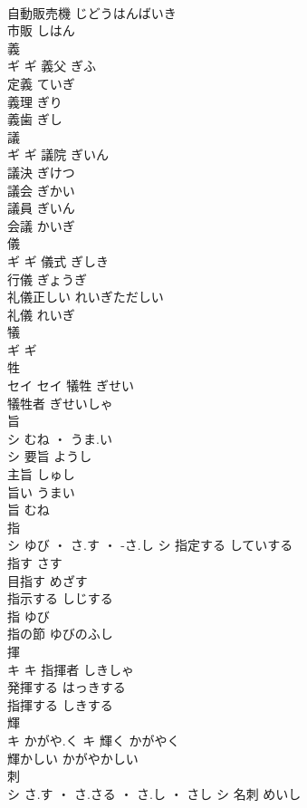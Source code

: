 \documentclass[8pt]{extreport}
\begin{document}
\begin{CJK}{UTF8}{min}
\\	自動販売機	じどうはんばいき	
\\	市販	しはん	
\\	義	
\\	ギ		ギ	義父	ぎふ	
\\	定義	ていぎ	
\\	義理	ぎり	
\\	義歯	ぎし	
\\	議	
\\	ギ		ギ	議院	ぎいん	
\\	議決	ぎけつ	
\\	議会	ぎかい	
\\	議員	ぎいん	
\\	会議	かいぎ	
\\	儀	
\\	ギ		ギ	儀式	ぎしき	
\\	行儀	ぎょうぎ	
\\	礼儀正しい	れいぎただしい	
\\	礼儀	れいぎ	
\\	犠	
\\	ギ		ギ																																			
\\	牲	
\\	セイ		セイ	犠牲	ぎせい	
\\	犠牲者	ぎせいしゃ	
\\	旨	
\\	シ	むね ・ うま.い
\\	シ	要旨	ようし	
\\	主旨	しゅし	
\\	旨い	うまい	
\\	旨	むね	
\\	指	
\\	シ	ゆび ・ さ.す ・ -さ.し	シ	指定する	していする	
\\	指す	さす	
\\	目指す	めざす	
\\	指示する	しじする	
\\	指	ゆび	
\\	指の節	ゆびのふし	
\\	揮	
\\	キ		キ	指揮者	しきしゃ	
\\	発揮する	はっきする	
\\	指揮する	しきする	
\\	輝	
\\	キ	かがや.く	キ	輝く	かがやく	
\\	輝かしい	かがやかしい	
\\	刺	
\\	シ	さ.す ・ さ.さる ・ さ.し ・ さし	シ	名刺	めいし	

\end{CJK}
\end{document}

